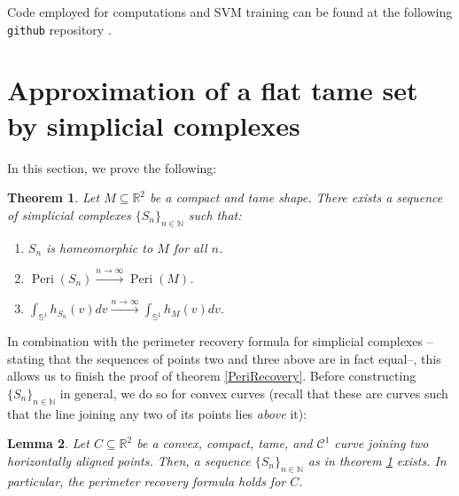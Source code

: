 \documentclass[a4paper]{article}
\newtheorem{theorem}{Theorem}[section]
\newtheorem{lemma}[theorem]{Lemma}
\newcommand{\bb}{\mathbb}
\newcommand{\Peri}{\operatorname{Peri}}
\begin{document}
Code employed for computations and SVM training can be found at the following \texttt{github} repository \cite{Gacias_Franco_ECT_Support}.
	
	
	\newpage
	{}
	
	
	\newpage
	\appendix
\section{Approximation of a flat tame set by simplicial complexes}

In this section, we prove the following:
\begin{theorem}
	\label{Approx}
	Let $M \subseteq \bb R^2$ be a compact and tame shape. There exists a sequence of simplicial complexes $\{S_n\}_{n \in \bb N}$ such that:
	
	\begin{enumerate}
		\item $S_n$ is homeomorphic to $M$ for all $n$.
		\item $\Peri(S_n) \overset{n \to \infty}{\longrightarrow} \Peri(M)$.
		\item $\int_{\bb S^{1}}h_{S_n}(v) dv \overset{n \to \infty}{\longrightarrow} \int_{\bb S^{1}} h_M(v) dv$.
	\end{enumerate}
\end{theorem}
In combination with the perimeter recovery formula for simplicial complexes --stating that the sequences of points two and three above are in fact equal--, this allows us to finish the proof of theorem \ref{PeriRecovery}. Before constructing $\{S_n\}_{n \in \bb N}$ in general, we do so for convex curves (recall that these are curves such that the line joining any two of its points lies \emph{above} it):
\begin{lemma}
	\label{ConvexCurve}
	Let $C \subseteq \bb R^2$ be a convex, compact, tame, and $\mathcal C^1$ curve joining two horizontally aligned points. Then, a sequence $\{S_n\}_{n \in \bb N}$ as in theorem \ref{Approx} exists. In particular, the perimeter recovery formula holds for $C$.
\end{lemma}
\end{document}
